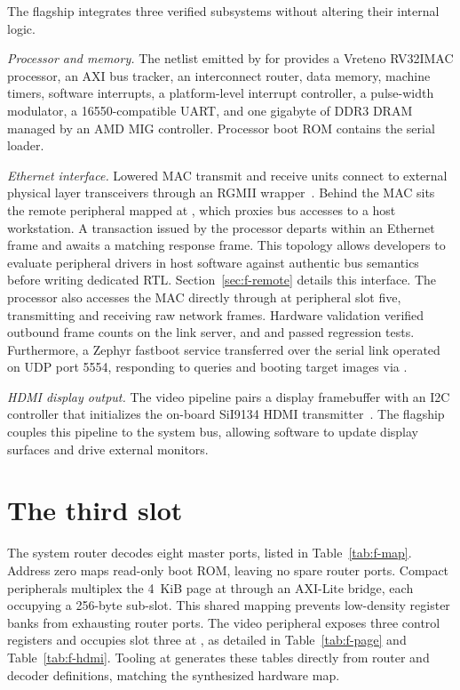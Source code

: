 \documentclass[journal,9pt]{IEEEtran}
\begin{document}
The flagship integrates three verified subsystems without altering their
internal logic.

\emph{Processor and memory.} The  netlist emitted by
\code{\#[lower]} for  provides a Vreteno RV32IMAC
processor, an AXI bus tracker, an interconnect router, data memory, machine
timers, software interrupts, a platform-level interrupt controller, a
pulse-width modulator, a 16550-compatible UART, and one gigabyte of DDR3
DRAM managed by an AMD MIG controller. Processor boot ROM contains the serial
loader.

\emph{Ethernet interface.} Lowered MAC transmit and receive units connect to
external physical layer transceivers through an RGMII wrapper~\cite{eth}. Behind
the MAC sits the remote peripheral mapped at , which proxies bus
accesses to a host workstation. A transaction issued by the processor departs
within an Ethernet frame and awaits a matching response frame. This topology
allows developers to evaluate peripheral drivers in host software against
authentic bus semantics before writing dedicated RTL. Section~\ref{sec:f-remote}
details this interface. The processor also accesses the MAC directly through
 at peripheral slot five, transmitting and receiving raw network
frames. Hardware validation verified outbound frame counts on the link server,
and  and  passed regression tests. Furthermore, a
Zephyr fastboot service transferred over the serial link operated on UDP port
5554, responding to  queries and booting target images via
.

\emph{HDMI display output.} The video pipeline pairs a display framebuffer
with an I2C controller that initializes the on-board SiI9134 HDMI
transmitter~\cite{hdmi}. The flagship couples this pipeline to the system
bus, allowing software to update display surfaces and drive external monitors.

\section{The third slot}
\label{sec:f-slot}

The system router decodes eight master ports, listed in Table~\ref{tab:f-map}.
Address zero maps read-only boot ROM, leaving no spare router ports. Compact
peripherals multiplex the 4~KiB page at  through an AXI-Lite
bridge, each occupying a 256-byte sub-slot. This shared mapping prevents
low-density register banks from exhausting router ports. The video peripheral
exposes three control registers and occupies slot three at , as
detailed in Table~\ref{tab:f-page} and Table~\ref{tab:f-hdmi}. Tooling at
 generates these tables directly from router and decoder
definitions, matching the synthesized hardware map.
\end{document}
